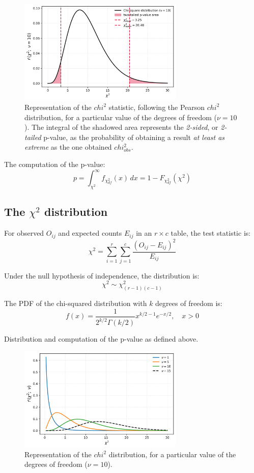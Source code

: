 \documentclass{book}
\begin{document}
\begin{figure}[ht]
    \centering
    \includegraphics[width=0.7\textwidth]{figures/chapter4/chi2_test_two_tailed.png}
    \caption{Representation of the $chi^{2}$ statistic, following the Pearson $chi^{2}$ distribution, for a particular value of the degrees of freedom ($\nu = 10$). The integral of the shadowed area represents the \textit{2-sided}, or \textit{2-tailed} p-value, as the probability of obtaining a result \textit{at least as extreme} as the one obtained $chi^{2}_{obs}$.}
    \label{fig:chi2_test2}
\end{figure}

The computation of the p-value:
\[
p = \int_{\chi^2}^{\infty} f_{\chi^2_{df}}(x)\,dx = 1 - F_{\chi^2_{df}}(\chi^2)
\]

\subsection*{The $\chi^{2}$ distribution}

For observed \( O_{ij} \) and expected counts \( E_{ij} \) in an \( r \times c \) table, the test statistic is:
\[
\chi^2 = \sum_{i=1}^{r} \sum_{j=1}^{c} \frac{(O_{ij} - E_{ij})^2}{E_{ij}}
\]

Under the null hypothesis of independence, the distribution is:
\[
\chi^2 \sim \chi^2_{(r-1)(c-1)}
\]

The PDF of the chi-squared distribution with \( k \) degrees of freedom is:
\[
f(x) = \frac{1}{2^{k/2} \Gamma(k/2)} x^{k/2 - 1} e^{-x/2}, \quad x > 0
\]

Distribution and computation of the p-value as defined above.

\begin{figure}[ht]
    \centering
    \includegraphics[width=0.7\textwidth]{figures/chapter4/chi2_distribution.png}
    \caption{Representation of the $chi^{2}$ distribution, for a particular value of the degrees of freedom ($\nu = 10$).}
    \label{fig:chi2_distribution}
\end{figure}
\end{document}
